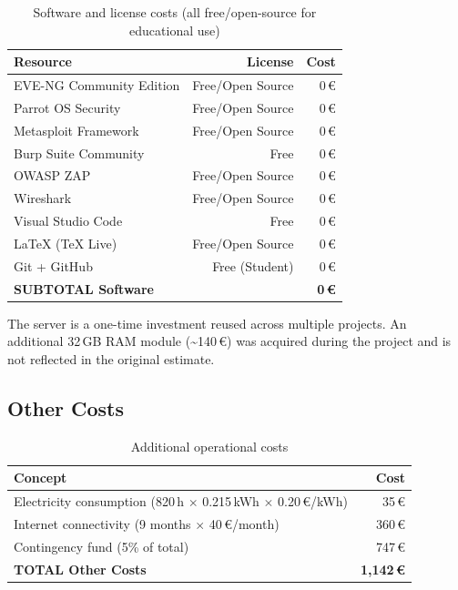 \begin{table}[H]
    \centering
    \begin{tabularx}{\textwidth}{Xrr}
\toprule
    \textbf{Resource} & \textbf{License} & \textbf{Cost} \\
\midrule
    EVE-NG Community Edition  & Free/Open Source & 0\,\euro \\
    Parrot OS Security        & Free/Open Source & 0\,\euro \\
    Metasploit Framework      & Free/Open Source & 0\,\euro \\
    Burp Suite Community      & Free             & 0\,\euro \\
    OWASP ZAP                 & Free/Open Source & 0\,\euro \\
    Wireshark                 & Free/Open Source & 0\,\euro \\
    Visual Studio Code        & Free             & 0\,\euro \\
    LaTeX (TeX Live)          & Free/Open Source & 0\,\euro \\
    Git + GitHub              & Free (Student)   & 0\,\euro \\
    \textbf{SUBTOTAL Software} & & \textbf{0\,\euro} \\
\bottomrule
    \end{tabularx}
    \caption{Software and license costs (all free/open-source for educational use)}
    \label{tab:software_costs}
\end{table}

\newpage

The server is a one-time investment reused across multiple projects. An additional 32\,GB RAM
module (\textasciitilde{}140\,\euro) was acquired during the project and is not reflected
in the original estimate.

\subsection{Other Costs}

\begin{table}[H]
    \centering
    \begin{tabularx}{\textwidth}{Xr}
\toprule
    \textbf{Concept} & \textbf{Cost} \\
\midrule
    Electricity consumption (820\,h $\times$ 0.215\,kWh $\times$ 0.20\,\euro/kWh) & 35\,\euro \\
    Internet connectivity (9 months $\times$ 40\,\euro/month)                     & 360\,\euro \\
    Contingency fund (5\% of total)                                                & 747\,\euro \\
    \textbf{TOTAL Other Costs} & \textbf{1{,}142\,\euro} \\
\bottomrule
    \end{tabularx}
    \caption{Additional operational costs}
    \label{tab:other_costs}
\end{table}

